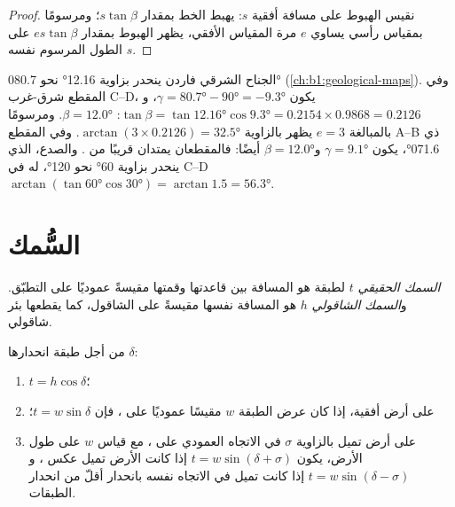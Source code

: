\begin{proof}
نقيس الهبوط على مسافة أفقية $s$: يهبط الخط بمقدار $s\tan\beta$؛ ومرسومًا بمقياس رأسي يساوي $e$ مرة المقياس الأفقي، يظهر الهبوط بمقدار $es\tan\beta$ على الطول المرسوم نفسه $s$.
\end{proof}

\begin{example}
الجناح الشرقي  فاردن ينحدر بزاوية \ang{12.16} نحو \ang{080.7} (\cref{ch:b1:geological-maps}). وفي المقطع شرق-غرب C--D، يكون $\gamma = \ang{80.7} - \ang{90} = \ang{-9.3}$، و$\tan\beta =
\tan\ang{12.16}\cos\ang{9.3} = 0.2154\times0.9868 = 0.2126$: $\beta =
\ang{12.0}$. ومرسومًا بالمبالغة $e = 3$ يظهر بالزاوية $\arctan(3\times0.2126) =
\ang{32.5}$. وفي المقطع A--B ذي  \ang{071.6}، يكون $\gamma = \ang{9.1}$ و$\beta = \ang{12.0}$ أيضًا: فالمقطعان يمتدان قريبًا من . والصدع، الذي ينحدر بزاوية \ang{60} نحو \ang{120}، له في C--D  $\arctan(\tan\ang{60}\cos\ang{30}) = \arctan 1.5 = \ang{56.3}$.
\end{example}

\section{السُّمك}

\begin{definition}\label{def:b1:cross-sections:thickness}
\emph{السمك الحقيقي} $t$ لطبقة هو المسافة بين قاعدتها وقمتها مقيسةً عموديًا على التطبّق. و\emph{السمك الشاقولي} $h$ هو المسافة نفسها مقيسةً على الشاقول، كما يقطعها بئر شاقولي.
\end{definition}

\begin{proposition}\label{prop:b1:cross-sections:thickness}
من أجل طبقة انحدارها $\delta$:
\begin{enumerate}
  \item $t = h\cos\delta$؛
  \item على أرض أفقية، إذا كان عرض  الطبقة $w$ مقيسًا عموديًا على ، فإن $t = w\sin\delta$؛
  \item على أرض تميل بالزاوية $\sigma$ في الاتجاه العمودي على ، مع قياس $w$ على طول الأرض، يكون $t = w\sin(\delta + \sigma)$ إذا كانت الأرض تميل عكس ، و$t = w\sin(\delta - \sigma)$ إذا كانت تميل في الاتجاه نفسه بانحدار أقلّ من انحدار الطبقات.
\end{enumerate}
\end{proposition}

